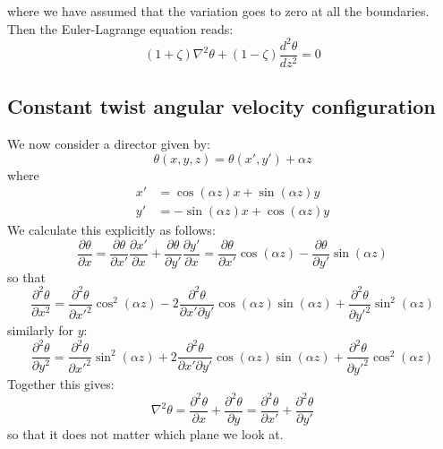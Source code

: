 \documentclass[reqno]{article}
\begin{document}
where we have assumed that the variation goes to zero at all the boundaries.
Then the Euler-Lagrange equation reads:
\begin{equation}
    (1 + \zeta) \nabla^2 \theta 
    + (1 - \zeta) \frac{d^2 \theta}{dz^2}
    = 
    0
\end{equation}

\subsection{Constant twist angular velocity configuration}

We now consider a director given by:
\begin{equation}
    \theta(x, y, z)
    =
    \theta(x', y') + \alpha z
\end{equation}
where
\begin{equation}
\begin{split}
    x' 
    &= 
    \cos(\alpha z) x + \sin(\alpha z) y \\
    y'
    &=
    -\sin(\alpha z) x + \cos(\alpha z) y
\end{split}
\end{equation}
We calculate this explicitly as follows:
\begin{equation}
    \frac{\partial \theta}{\partial x}
    =
    \frac{\partial \theta}{\partial x'} \frac{\partial x'}{\partial x}
    +
    \frac{\partial \theta}{\partial y'} \frac{\partial y'}{\partial x}
    =
    \frac{\partial \theta}{\partial x'} \cos(\alpha z)
    -
    \frac{\partial \theta}{\partial y'} \sin(\alpha z)
\end{equation}
so that
\begin{equation}
    \frac{\partial^2 \theta}{\partial x^2}
    =
    \frac{\partial^2 \theta}{\partial x'^2} \cos^2(\alpha z)
    -
    2 \frac{\partial^2 \theta}{\partial x' \partial y'} \cos(\alpha z) \sin(\alpha z)
    +
    \frac{\partial^2 \theta}{\partial y'^2} \sin^2(\alpha z)
\end{equation}
similarly for $y$:
\begin{equation}
    \frac{\partial^2 \theta}{\partial y^2}
    =
    \frac{\partial^2 \theta}{\partial x'^2} \sin^2(\alpha z)
    +
    2 \frac{\partial^2 \theta}{\partial x' \partial y'} \cos(\alpha z) \sin(\alpha z)
    +
    \frac{\partial^2 \theta}{\partial y'^2} \cos^2(\alpha z)
\end{equation}
Together this gives:
\begin{equation}
    \nabla^2 \theta
    =
    \frac{\partial^2 \theta}{\partial x} + \frac{\partial^2 \theta}{\partial y}
    =
    \frac{\partial^2 \theta}{\partial x'} + \frac{\partial^2 \theta}{\partial y'}
\end{equation}
so that it does not matter which plane we look at.
\end{document}
